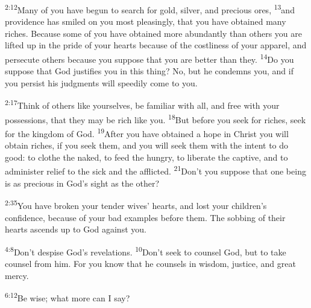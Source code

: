 \documentclass[openany,12pt,english]{book}
\newenvironment{para}{\par\pretolerance=100\tolerance=200\setlength{\emergencystretch}{0.6em}\relax}{\par}
\begin{document}
\begin{para}
    \textsuperscript{2:12}\thinspace{}Man\-y of you have be\-gun to search for gold, sil\-ver, and pre\-cious ores,
    \textsuperscript{13}\thinspace{}and prov\-i\-dence has smiled on you most pleas\-ing\-ly, that you have obtained man\-y rich\-es. Be\-cause some of you have obtained more a\-bun\-dant\-ly than others you are lifted up in the pride of your hearts be\-cause of the cost\-li\-ness of your ap\-par\-el, and per\-se\-cute others be\-cause you sup\-pose that you are bet\-ter than they. 
    \textsuperscript{14}\thinspace{}Do you sup\-pose that God justifies you in this thing? No, but he condemns you, and if you per\-sist his judgments will speed\-i\-ly come to you.
\end{para}

\begin{para}
    \textsuperscript{2:17}\thinspace{}Think of others like your\-selves, be fa\-mil\-iar with all, and free with your possessions, that they may be rich like you.
    \textsuperscript{18}\thinspace{}But be\-fore you seek for rich\-es, seek for the king\-dom of God.
    \textsuperscript{19}\thinspace{}Af\-ter you have obtained a hope in Christ you will ob\-tain rich\-es, if you seek them, and you will seek them with the in\-tent to do good: to clothe the na\-ked, to feed the hun\-gry, to lib\-er\-ate the cap\-tive, and to ad\-min\-is\-ter re\-lief to the sick and the afflicted.
    \textsuperscript{21}\thinspace{}Don't you sup\-pose that one be\-ing is as pre\-cious in God's sight as the oth\-er?
\end{para}

\begin{para}
    \textsuperscript{2:35}\thinspace{}You have bro\-ken your ten\-der wives' hearts, and lost your children's con\-fi\-dence, be\-cause of your bad examples be\-fore them. The sob\-bing of their hearts ascends up to God a\-gainst you.
\end{para}

\begin{para}
    \textsuperscript{4:8}\thinspace{}Don't des\-pise God's revelations.
    \textsuperscript{10}\thinspace{}Don't seek to coun\-sel God, but to take coun\-sel from him. For you know that he counsels in wis\-dom, jus\-tice, and great mer\-cy.
\end{para}

\begin{para}
    \textsuperscript{6:12}\thinspace{}Be wise; what more can I say?
\end{para}
\end{document}

